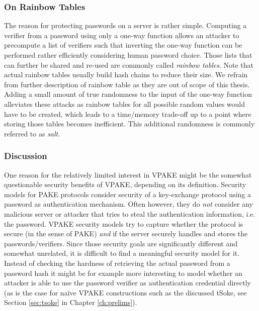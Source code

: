 \subsubsection{On Rainbow Tables}
The reason for protecting passwords on a server is rather simple.
Computing a verifier from a password using only a one-way function allows an attacker to precompute a list of verifiers such that inverting the one-way function can be performed rather efficiently considering human password choice.
Those lists that can further be shared and re-used are commonly called \emph{rainbow tables}.
Note that actual rainbow tables usually build hash chains to reduce their size.
We refrain from further description of rainbow table as they are out of scope of this thesis.
Adding a small amount of true randomness to the input of the one-way function alleviates these attacks as rainbow tables for all possible random values would have to be created, which leads to a time/memory trade-off up to a point where storing those tables becomes inefficient.
This additional randomness is commonly referred to as \emph{salt}.

\subsubsection{Discussion}\label{sec:intro:vpake-discusion}
One reason for the relatively limited interest in \acl{VPAKE} might be the somewhat questionable security benefits of \ac{VPAKE}, depending on its definition.
Security models for \ac{PAKE} protocols consider security of a key-exchange protocol using a password as authentication mechanism.
Often however, they do \emph{not} consider any malicious server or attacker that tries to steal the authentication information, i.e. the password.
\ac{VPAKE} security models try to capture whether the protocol is secure (in the sense of \acl{PAKE}) \emph{and} if the server securely handles and stores the passwords/verifiers.
Since those security goals are significantly different and somewhat unrelated, it is difficult to find a meaningful security model for it.
Instead of checking the hardness of retrieving the actual password from a password hash it might be for example more interesting to model whether an attacker is able to use the password verifier as authentication credential directly (as is the case for na{\"i}ve \ac{VPAKE} constructions such as the discussed tSoke, see Section \ref{sec:tsoke} in Chapter \ref{ch:prelims}).

